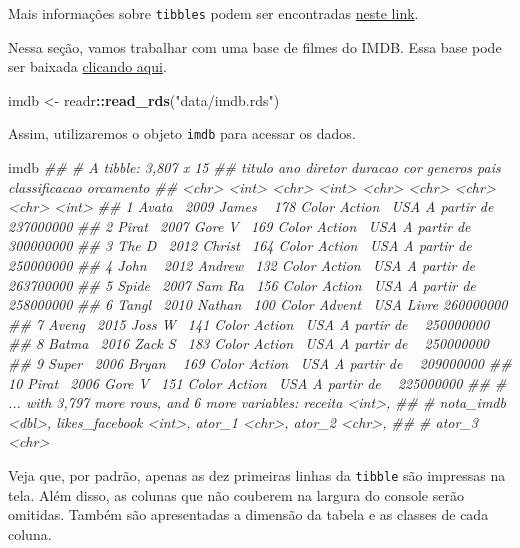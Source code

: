 \documentclass[
]{book}
\newenvironment{Shaded}{\begin{snugshade}}{\end{snugshade}}
\newcommand{\CommentTok}[1]{\textcolor[rgb]{0.56,0.35,0.01}{\textit{#1}}}
\newcommand{\KeywordTok}[1]{\textcolor[rgb]{0.13,0.29,0.53}{\textbf{#1}}}
\newcommand{\NormalTok}[1]{#1}
\newcommand{\OperatorTok}[1]{\textcolor[rgb]{0.81,0.36,0.00}{\textbf{#1}}}
\newcommand{\StringTok}[1]{\textcolor[rgb]{0.31,0.60,0.02}{#1}}
\begin{document}
Mais informações sobre \texttt{tibbles} podem ser encontradas \href{http://r4ds.had.co.nz/tibbles.html}{neste link}.

Nessa seção, vamos trabalhar com uma base de filmes do IMDB. Essa base pode ser baixada \href{https://github.com/curso-r/site-v2/raw/master/content/material/importacao/data/imdb.rds}{clicando aqui}.

\begin{Shaded}
\begin{Highlighting}[]
\NormalTok{imdb <-}\StringTok{ }\NormalTok{readr}\OperatorTok{::}\KeywordTok{read_rds}\NormalTok{(}\StringTok{"data/imdb.rds"}\NormalTok{)}
\end{Highlighting}
\end{Shaded}

Assim, utilizaremos o objeto \texttt{imdb} para acessar os dados.

\begin{Shaded}
\begin{Highlighting}[]
\NormalTok{imdb}
\CommentTok{## # A tibble: 3,807 x 15}
\CommentTok{##    titulo   ano diretor duracao cor   generos pais  classificacao orcamento}
\CommentTok{##    <chr>  <int> <chr>     <int> <chr> <chr>   <chr> <chr>             <int>}
\CommentTok{##  1 Avata~  2009 James ~     178 Color Action~ USA   A partir de ~ 237000000}
\CommentTok{##  2 Pirat~  2007 Gore V~     169 Color Action~ USA   A partir de ~ 300000000}
\CommentTok{##  3 The D~  2012 Christ~     164 Color Action~ USA   A partir de ~ 250000000}
\CommentTok{##  4 John ~  2012 Andrew~     132 Color Action~ USA   A partir de ~ 263700000}
\CommentTok{##  5 Spide~  2007 Sam Ra~     156 Color Action~ USA   A partir de ~ 258000000}
\CommentTok{##  6 Tangl~  2010 Nathan~     100 Color Advent~ USA   Livre         260000000}
\CommentTok{##  7 Aveng~  2015 Joss W~     141 Color Action~ USA   A partir de ~ 250000000}
\CommentTok{##  8 Batma~  2016 Zack S~     183 Color Action~ USA   A partir de ~ 250000000}
\CommentTok{##  9 Super~  2006 Bryan ~     169 Color Action~ USA   A partir de ~ 209000000}
\CommentTok{## 10 Pirat~  2006 Gore V~     151 Color Action~ USA   A partir de ~ 225000000}
\CommentTok{## # ... with 3,797 more rows, and 6 more variables: receita <int>,}
\CommentTok{## #   nota_imdb <dbl>, likes_facebook <int>, ator_1 <chr>, ator_2 <chr>,}
\CommentTok{## #   ator_3 <chr>}
\end{Highlighting}
\end{Shaded}

Veja que, por padrão, apenas as dez primeiras linhas da \texttt{tibble} são impressas na tela. Além disso, as colunas que não couberem na largura do console serão omitidas. Também são apresentadas a dimensão da tabela e as classes de cada coluna.
\end{document}
